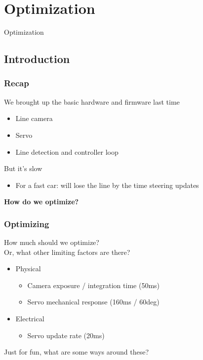 \documentclass{beamer}
\begin{document}
\begin{frame}
\titlepage
\setcounter{tocdepth}{1}
\tableofcontents
\end{frame}

\section{Optimization} %
\begin{frame}
\centering \huge Optimization
\end{frame}


\subsection{Introduction}
\begin{frame}
\frametitle{Recap}
We brought up the basic hardware and firmware last time \\
\begin{itemize}
  \item Line camera
  \item Servo
  \item Line detection and controller loop
\end{itemize}
\hfill \break
But it's slow
\begin{itemize}
  \item For a fast car: will lose the line by the time steering updates
\end{itemize}
\hfill \break
\textbf{How do we optimize?}
\end{frame}


\begin{frame}
\frametitle{Optimizing}
How much should we optimize? \\
Or, what other limiting factors are there?

 {
\begin{itemize}
  \item Physical
   {
    \begin{itemize}
      \item Camera exposure / integration time (50ms)
      \item Servo mechanical response (160ms / 60deg)
    \end{itemize}
  }
  \item Electrical
   {
    \begin{itemize}
      \item Servo update rate (20ms)
    \end{itemize}
  }
\end{itemize}
}
 {
Just for fun, what are some ways around these?
}
\end{frame}
\end{document}
